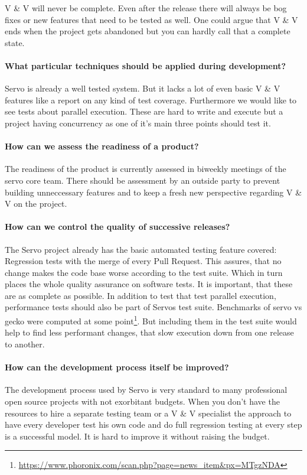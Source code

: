 \documentclass{scrartcl}
\begin{document}
V \& V will never be complete. Even after the release there will always be bog fixes or new features that need to be tested as well. One could argue that V \& V ends when the project gets abandoned but you can hardly call that a complete state.

\paragraph{What particular techniques should be applied during development?}
Servo is already a well tested system. But it lacks a lot of even basic V \& V features like a report on any kind of test coverage. Furthermore we would like to see tests about parallel execution. These are hard to write and execute but a project having concurrency as one of it's main three points should test it.

\paragraph{How can we assess the readiness of a product?} 
The readiness of the product is currently assessed in biweekly meetings of the servo core team. There should be assessment by an outside party to prevent building unneccessary features and to keep a fresh new perspective regarding V \& V on the project.

\paragraph{How can we control the quality of successive releases?}
The Servo project already has the basic automated testing feature covered: Regression tests with the merge of every Pull Request. This assures, that no change makes the code base worse according to the test suite. Which in turn places the whole quality assurance on software tests. It is important, that these are as complete as possible. In addition to test that test parallel execution, performance tests should also be part of Servos test suite. Benchmarks of servo vs gecko were computed at some point\footnote{\url{https://www.phoronix.com/scan.php?page=news_item&px=MTgzNDA}}. But including them in the test suite would help to find less performant changes, that slow execution down from one release to another.

\paragraph{How can the development process itself be improved?}
The development process used by Servo is very standard to many professional open source projects with not exorbitant budgets. When you don't have the resources to hire a separate testing team or a V \& V specialist the approach to have every developer test his own code and do full regression testing at every step is a successful model. It is hard to improve it without raising the budget. 
\end{document}
